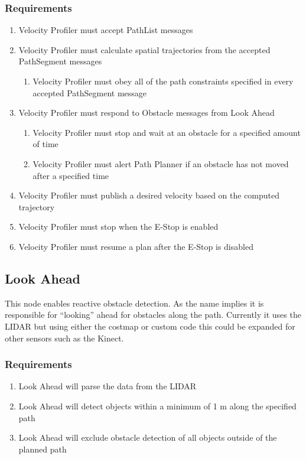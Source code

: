 \subsubsection{Requirements}
\begin{enumerate}
  \item Velocity Profiler must accept PathList messages
  \item Velocity Profiler must calculate spatial trajectories from
        the accepted PathSegment messages
        \begin{enumerate}
           \item Velocity Profiler must obey all of the path constraints
                 specified in every accepted PathSegment message
        \end {enumerate}
  \item Velocity Profiler must respond to Obstacle messages from Look
        Ahead
        \begin{enumerate}
           \item Velocity Profiler must stop and wait at an obstacle for a
                 specified amount of time
           \item Velocity Profiler must alert Path Planner if an obstacle
                 has not moved after a specified time
        \end{enumerate}
   \item Velocity Profiler must publish a desired velocity based on the computed trajectory
   \item Velocity Profiler must stop when the E-Stop is enabled
   \item Velocity Profiler must resume a plan after the E-Stop is
         disabled
\end{enumerate}
      
\subsection{Look Ahead}

This node enables reactive obstacle detection. As the name implies it is responsible for ``looking'' ahead for obstacles along the path. Currently it uses the LIDAR but using either the costmap or custom code this could be expanded for other sensors such as the Kinect.

  \subsubsection{Requirements}
  \begin{enumerate}
     \item Look Ahead will parse the data from the LIDAR
     \item Look Ahead will detect objects within a minimum of 1 m along the specified path
     \item Look Ahead will exclude obstacle detection of all objects
           outside of the planned path
  \end{enumerate}

